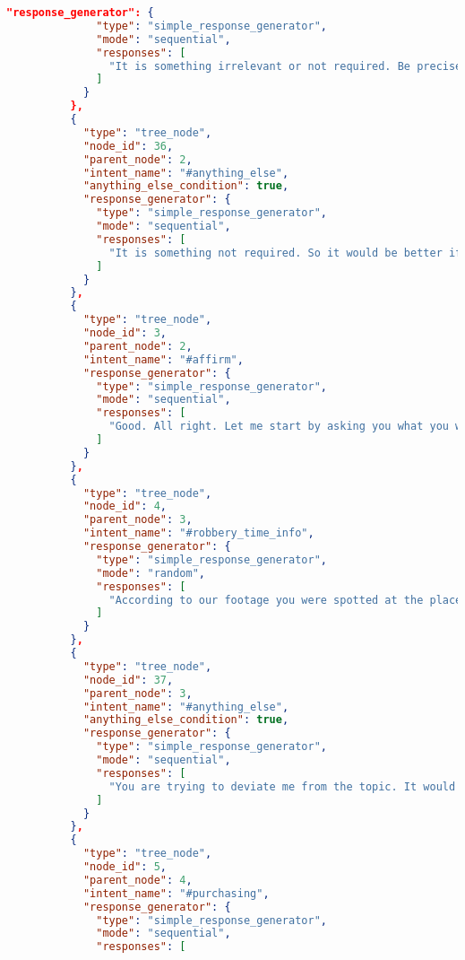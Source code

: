 \begin{appendix}
\begin{lstlisting}[language=json, firstnumber=1]
            "response_generator": {
              "type": "simple_response_generator",
              "mode": "sequential",
              "responses": [
                "It is something irrelevant or not required. Be precised while answering my questions! So it would be better if you just give me a consent to continue."
              ]
            }
          },
          {
            "type": "tree_node",
            "node_id": 36,
            "parent_node": 2,
            "intent_name": "#anything_else",
            "anything_else_condition": true,
            "response_generator": {
              "type": "simple_response_generator",
              "mode": "sequential",
              "responses": [
                "It is something not required. So it would be better if you just answer my last question positively."
              ]
            }
          },
          {
            "type": "tree_node",
            "node_id": 3,
            "parent_node": 2,
            "intent_name": "#affirm",
            "response_generator": {
              "type": "simple_response_generator",
              "mode": "sequential",
              "responses": [
                "Good. All right. Let me start by asking you what you were doing on the night of April 7?"
              ]
            }
          },
          {
            "type": "tree_node",
            "node_id": 4,
            "parent_node": 3,
            "intent_name": "#robbery_time_info",
            "response_generator": {
              "type": "simple_response_generator",
              "mode": "random",
              "responses": [
                "According to our footage you were spotted at the place @place of robbery. Why did you go there?"
              ]
            }
          },
          {
            "type": "tree_node",
            "node_id": 37,
            "parent_node": 3,
            "intent_name": "#anything_else",
            "anything_else_condition": true,
            "response_generator": {
              "type": "simple_response_generator",
              "mode": "sequential",
              "responses": [
                "You are trying to deviate me from the topic. It would be better if you don't waste our time. Better if you just answer precisely to my questions."
              ]
            }
          },
          {
            "type": "tree_node",
            "node_id": 5,
            "parent_node": 4,
            "intent_name": "#purchasing",
            "response_generator": {
              "type": "simple_response_generator",
              "mode": "sequential",
              "responses": [

\end{lstlisting}
\end{appendix}
